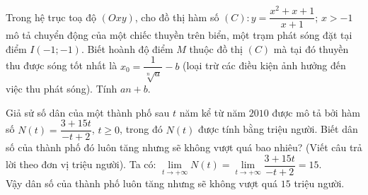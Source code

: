 \begin{ex}%
	Trong hệ trục toạ độ $(Oxy)$, cho đồ thị hàm số $(C)\colon y=\dfrac{x^2+x+1}{x+1}$; $x>-1$ mô tả chuyển động của một chiếc thuyền trên biển, một trạm phát sóng đặt tại điểm $I(-1;-1)$. Biết hoành độ điểm $M$ thuộc đồ thị $(C)$ mà tại đó thuyền thu được sóng tốt nhất là $x_0=\dfrac{1}{\sqrt[n]{a}}-b$ (loại trừ các điều kiện ảnh hưởng đến việc thu phát sóng). Tính $an+b$.
\end{ex}

\begin{ex}%
	Giả sử số dân của một thành phố sau $t$ năm kể từ năm $2010$ được mô tả bởi hàm số $N(t)=\dfrac{3+15t}{-t+2}$, $t\geq 0$, trong đó $N(t)$ được tính bằng triệu người. Biết dân số của thành phố đó luôn tăng nhưng sẽ không vượt quá bao nhiêu? (Viết câu trả lời theo đơn vị triệu người).
	\loigiai
	{Ta có: $\lim\limits_{t\to +\infty} N(t)=\lim\limits_{t\to +\infty}\dfrac{3+15t}{-t+2}=15$.\\
		Vậy dân số của thành phố luôn tăng nhưng sẽ không vượt quá $15$ triệu người.
	}
\end{ex}

